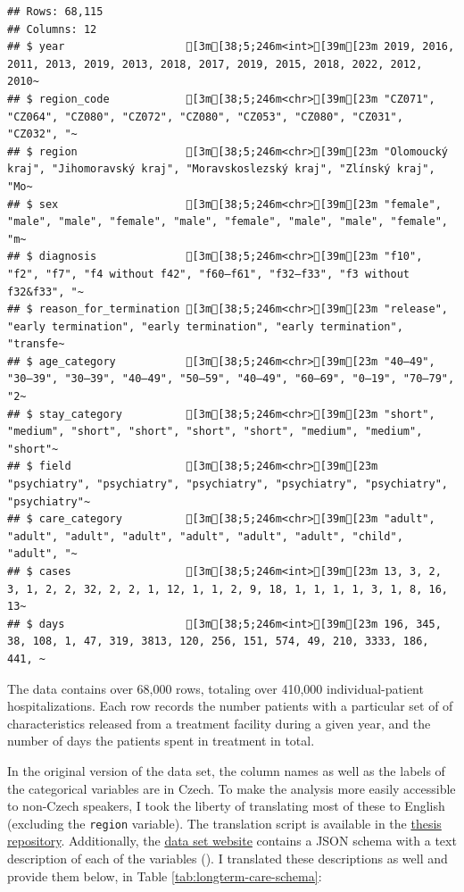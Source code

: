 \documentclass[
]{book}
\theoremstyle{definition}
\theoremstyle{definition}
\theoremstyle{definition}
\theoremstyle{definition}
\theoremstyle{remark}
\begin{document}
\begin{verbatim}
## Rows: 68,115
## Columns: 12
## $ year                   [3m[38;5;246m<int>[39m[23m 2019, 2016, 2011, 2013, 2019, 2013, 2018, 2017, 2019, 2015, 2018, 2022, 2012, 2010~
## $ region_code            [3m[38;5;246m<chr>[39m[23m "CZ071", "CZ064", "CZ080", "CZ072", "CZ080", "CZ053", "CZ080", "CZ031", "CZ032", "~
## $ region                 [3m[38;5;246m<chr>[39m[23m "Olomoucký kraj", "Jihomoravský kraj", "Moravskoslezský kraj", "Zlínský kraj", "Mo~
## $ sex                    [3m[38;5;246m<chr>[39m[23m "female", "male", "male", "female", "male", "female", "male", "male", "female", "m~
## $ diagnosis              [3m[38;5;246m<chr>[39m[23m "f10", "f2", "f7", "f4 without f42", "f60–f61", "f32–f33", "f3 without f32&f33", "~
## $ reason_for_termination [3m[38;5;246m<chr>[39m[23m "release", "early termination", "early termination", "early termination", "transfe~
## $ age_category           [3m[38;5;246m<chr>[39m[23m "40–49", "30–39", "30–39", "40–49", "50–59", "40–49", "60–69", "0–19", "70–79", "2~
## $ stay_category          [3m[38;5;246m<chr>[39m[23m "short", "medium", "short", "short", "short", "short", "medium", "medium", "short"~
## $ field                  [3m[38;5;246m<chr>[39m[23m "psychiatry", "psychiatry", "psychiatry", "psychiatry", "psychiatry", "psychiatry"~
## $ care_category          [3m[38;5;246m<chr>[39m[23m "adult", "adult", "adult", "adult", "adult", "adult", "adult", "child", "adult", "~
## $ cases                  [3m[38;5;246m<int>[39m[23m 13, 3, 2, 3, 1, 2, 2, 32, 2, 2, 1, 12, 1, 1, 2, 9, 18, 1, 1, 1, 1, 3, 1, 8, 16, 13~
## $ days                   [3m[38;5;246m<int>[39m[23m 196, 345, 38, 108, 1, 47, 319, 3813, 120, 256, 151, 574, 49, 210, 3333, 186, 441, ~
\end{verbatim}

The data contains over 68,000 rows, totaling over 410,000 individual-patient hospitalizations. Each row records the number patients with a particular set of of characteristics released from a treatment facility during a given year, and the number of days the patients spent in treatment in total.

In the original version of the data set, the column names as well as the labels of the categorical variables are in Czech. To make the analysis more easily accessible to non-Czech speakers, I took the liberty of translating most of these to English (excluding the \texttt{region} variable). The translation script is available in the \href{https://github.com/bartonicek/thesis/blob/master/longterm_care_translate.R}{thesis repository}. Additionally, the \href{https://www.nzip.cz/data/2060-dlouhodoba-psychiatricka-pece}{data set website} contains a JSON schema with a text description of each of the variables (). I translated these descriptions as well and provide them below, in Table \ref{tab:longterm-care-schema}:
\end{document}
